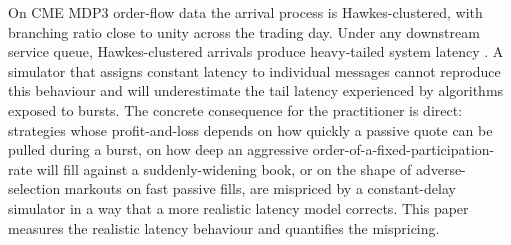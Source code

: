 \documentclass[11pt]{article}
\begin{document}
On CME MDP3 order-flow data the arrival process is Hawkes-clustered, with branching ratio close to unity across the trading day. Under any downstream service queue, Hawkes-clustered arrivals produce heavy-tailed system latency \citep{dawpender2018queues}. A simulator that assigns constant latency to individual messages cannot reproduce this behaviour and will underestimate the tail latency experienced by algorithms exposed to bursts. The concrete consequence for the practitioner is direct: strategies whose profit-and-loss depends on how quickly a passive quote can be pulled during a burst, on how deep an aggressive order-of-a-fixed-participation-rate will fill against a suddenly-widening book, or on the shape of adverse-selection markouts on fast passive fills, are mispriced by a constant-delay simulator in a way that a more realistic latency model corrects. This paper measures the realistic latency behaviour and quantifies the mispricing.
\end{document}
